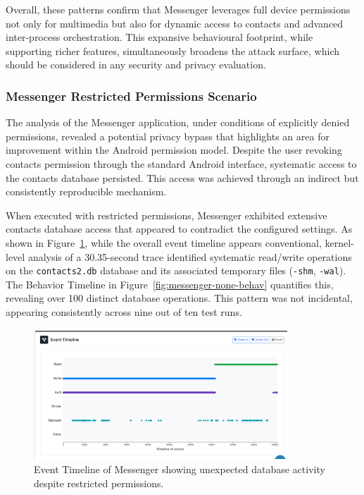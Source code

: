 \documentclass[a4paper,12pt]{report}
\begin{document}
Overall, these patterns confirm that Messenger leverages full device permissions not only for multimedia but also for dynamic access to contacts and advanced inter-process orchestration. This expansive behavioural footprint, while supporting richer features, simultaneously broadens the attack surface, which should be considered in any security and privacy evaluation.


\subsubsection{Messenger Restricted Permissions Scenario}
The analysis of the Messenger application, under conditions of explicitly denied permissions, revealed a potential privacy bypass that highlights an area for improvement within the Android permission model. Despite the user revoking contacts permission through the standard Android interface, systematic access to the contacts database persisted. This access was achieved through an indirect but consistently reproducible mechanism.

When executed with restricted permissions, Messenger exhibited extensive contacts database access that appeared to contradict the configured settings. As shown in Figure~\ref{fig:messenger-none-events}, while the overall event timeline appears conventional, kernel-level analysis of a 30.35-second trace identified systematic read/write operations on the \texttt{contacts2.db} database and its associated temporary files (\texttt{-shm}, \texttt{-wal}). The Behavior Timeline in Figure~\ref{fig:messenger-none-behav} quantifies this, revealing over 100 distinct database operations. This pattern was not incidental, appearing consistently across nine out of ten test runs.

\begin{figure}[H]
    \centering
    \includegraphics[width=0.85\textwidth]{messenger-none-events.png}
    \caption{Event Timeline of Messenger showing unexpected database activity despite restricted permissions.}
    \label{fig:messenger-none-events}
\end{figure}
\end{document}
